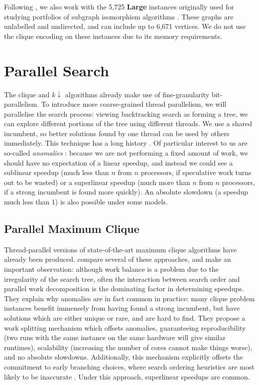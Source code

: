 \documentclass[sigconf]{acmart}
\begin{document}
\noindent
Following \citet{DBLP:conf/aaai/HoffmannMR17}, we also work with the 5,725 \textbf{Large} instances
originally used for studying portfolios of subgraph isomorphism algorithms
\citep{DBLP:conf/lion/KotthoffMS16}. These graphs are unlabelled and undirected, and can include up
to 6,671 vertices. We do not use the clique encoding on these instances due to its
memory requirements.

\section{Parallel Search}

The clique and $k{\downarrow}$ algorithms already make use of fine-granularity bit-parallelism. To
introduce more coarse-grained thread parallelism, we will parallelise the search process: viewing
backtracking search as forming a tree, we can explore different portions of the tree using different
threads. We use a shared incumbent, so better solutions found by one thread can be used by others
immediately. This technique has a long history \citep{o:BaderHC05}. Of particular
interest to us are so-called \emph{anomalies}
\citep{DBLP:journals/cacm/LaiS84,DBLP:journals/tc/LiW86,DBLP:conf/irregular/BruinKT95}:
because we are not performing a fixed amount of work, we should have no expectation of a linear
speedup, and instead we could see a sublinear speedup (much less than $n$ from $n$ processors, if
speculative work turns out to be wasted) or a superlinear speedup (much more than $n$ from $n$
processors, if a strong incumbent is found more quickly). An absolute slowdown (a speedup much less
than 1) is also possible under some models.

\subsection{Parallel Maximum Clique}

Thread-parallel versions of state-of-the-art maximum clique algorithms have already been produced.
\citet{DBLP:journals/topc/McCreeshP15} compare several of these approaches, and make an important
observation: although work balance is a problem due to the irregularity of the search tree, often
the interaction between search order and parallel work decomposition is the dominating factor in
determining speedups. They explain why anomalies are in fact common in practice: many clique problem
instances benefit immensely from having found a strong incumbent, but have solutions which are
either unique or rare, and are hard to find. They propose a work splitting mechanism which offsets
anomalies, guaranteeing reproducibility (two runs with the same instance on the same hardware will
give similar runtimes), scalability (increasing the number of cores cannot make things worse), and
no absolute slowdowns.  Additionally, this mechanism explicitly offsets the commitment to early
branching choices, where search ordering heuristics are most likely to be inaccurate
\citep{DBLP:conf/ijcai/HarveyG95,DBLP:conf/cp/ChuSS09}. Under this approach, superlinear speedups
are common.
\end{document}
